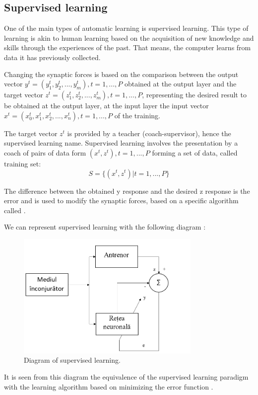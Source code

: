 \subsection{Supervised learning}

One of the main types of automatic learning is supervised learning. This type of learning is akin to human learning based on the acquisition of new knowledge and skills through the experiences of the past. That means, the computer learns from data it has previously collected.

Changing the synaptic forces is based on the comparison between the output vector $ y ^ t = (y ^ t_1, y ^ t_2, ..., y ^ t_m), t = 1, ..., P $ obtained at the output layer and the target vector $ z ^ t = (z ^ t_1, z ^ t_2, ..., z ^ t_m), t = 1, ..., P $, representing the desired result to be obtained at the output layer, at the input layer the input vector $ x ^ t = (x ^ t_0, x ^ t_1, x ^ t_2, ..., x ^ t_n), t = 1, ..., P $ of the training.

The target vector $ z ^ t $ is provided by a teacher (coach-supervisor), hence the supervised learning name. Supervised learning involves the presentation by a coach of pairs of data form $ (x ^ t, z ^ t), t = 1, ..., P $ forming a set of data, called training set: $$ S = \{(x ^ t, z ^ t) | t = 1, ..., P \} $$

The difference between the obtained y response and the desired z response is the error and is used to modify the synaptic forces, based on a specific algorithm called \cite{calculNeuronal}.

We can represent supervised learning with the following diagram \cite{Baum}:

\begin{figure}[H]
  \centering
  \includegraphics[width=3.5in]{images/diagramaInvSupervizate.png}
  \caption {Diagram of supervised learning.}
\end{figure}

It is seen from this diagram the equivalence of the supervised learning paradigm with the learning algorithm based on minimizing the error function \cite{Haykin}.